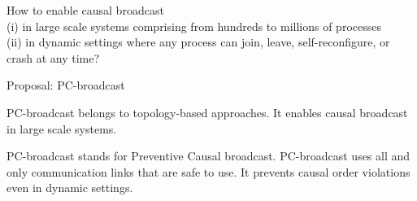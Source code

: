 \documentclass[10pt, xcolor={usenames, dvipsnames}]{beamer}
\newcommand{\xmark}{\ding{55}}
\newcommand{\NO}[1]{\textcolor{red}{#1}}
\begin{document}
\begin{frame}[standout]
  How to enable causal broadcast\\
  (i) in large scale systems comprising
  from hundreds to millions of processes\\
  (ii) in dynamic settings where any process can join, leave, self-reconfigure,
  or crash at any time?

  \vspace{2em}
  
  

\end{frame}


\begin{frame}{Proposal: PC-broadcast}  

  PC-broadcast belongs to topology-based approaches. It enables causal broadcast
  in large scale systems.

  \vspace{2em}

  PC-broadcast stands for Preventive Causal broadcast. PC-broadcast uses all
  and only communication links that are safe to use. It prevents causal order
  violations even in dynamic settings.

\end{frame}




%       
%       
%       
\end{document}
